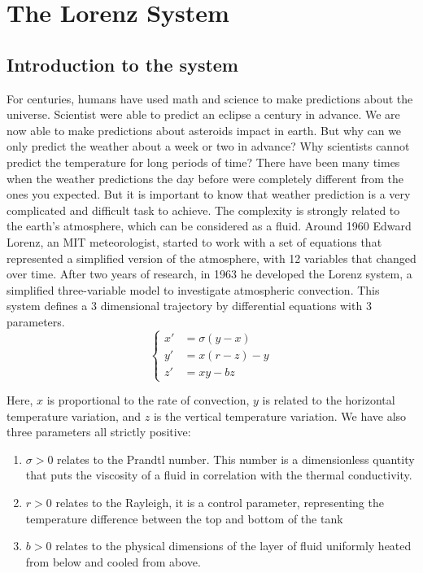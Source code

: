 \documentclass[12pt]{article}
\begin{document}
	
	
	
	\newpage
	
	\section{The Lorenz System}
	
	\subsection{Introduction to the system}
	
	For centuries, humans have used math and science to make predictions about the universe. Scientist were able to predict an eclipse a century in advance. We are now able to make predictions about asteroids impact in earth. But why can we only predict the weather about a week or two in advance? Why scientists cannot predict the temperature for long periods of time? There have been many times when the weather predictions the day before were completely different from the ones you expected. But it is important to know that weather prediction is a very complicated and difficult task to achieve. The complexity is strongly related to the earth's atmosphere, which can be considered as a fluid. 
	Around 1960 Edward Lorenz, an MIT meteorologist, started to work with a set of equations that represented a simplified version of the atmosphere, with 12 variables that changed over time. After two years of research, in 1963 he developed the Lorenz system, a simplified three-variable model to investigate atmospheric convection. This system defines a 3 dimensional trajectory by differential equations with 3 parameters.
	$$
	\begin{cases}
		
		x'&=\sigma(y-x) \\
		y'&=x(r-z)-y \\
		z'&=xy-bz
		
	\end{cases}
	$$
	
	\noindent Here, $x$ is proportional to the rate of convection, $y$ is related to the horizontal temperature variation, and $z$ is the vertical temperature variation.
	We have also three parameters all strictly positive:
	\begin{enumerate}[label=\textbullet]
		\item $\sigma > 0$  relates to the Prandtl number. This number is a dimensionless quantity that puts the viscosity of a fluid in correlation with the thermal conductivity.
		\item $r > 0$  relates to the Rayleigh, it is a control parameter, representing the temperature difference between the top and bottom of the tank
		\item $b > 0$ relates to the physical dimensions of the layer of fluid uniformly heated from below and cooled from above.
	\end{enumerate}
	
\end{document}
